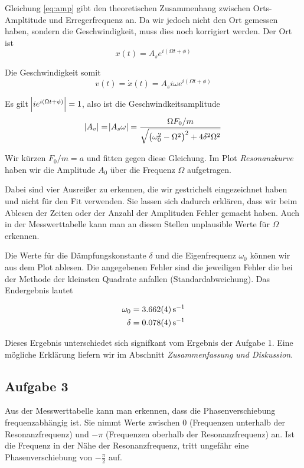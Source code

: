 \documentclass[a4paper,german,12pt,smallheadings]{scrartcl}
\begin{document}
\vspace{1cm}

Gleichung \ref{eq:amp} gibt den theoretischen Zusammenhang zwischen
Orts-Ampltitude und Erregerfrequenz an. Da wir jedoch nicht den Ort gemessen
haben, sondern die Geschwindigkeit, muss dies noch korrigiert werden. Der Ort
ist
\begin{equation}
  x(t) = A_s e^{i(\Omega t + \phi)}
\end{equation}

Die Geschwindigkeit somit
\begin{equation}
  v(t) = \dot{x}(t) = A_s i \omega e^{i(\Omega t + \phi)}
\end{equation}

Es gilt $\envert{i e^{i(\Omega t + \phi)}} = 1$, also ist die
Geschwindkeitsamplitude
\begin{equation}
  \envert{A_v} = \envert{A_s \omega} = \frac{\Omega F_0 / m}{\sqrt{\del{\omega_0^2 - \Omega^2}^2 + 4 \delta^2 \Omega^2}}
\end{equation}

Wir kürzen $F_0 / m = a$ und fitten gegen diese Gleichung. Im Plot
\textit{Resonanzkurve} haben wir die Amplitude $A_0$ über die Frequenz $\Omega$
aufgetragen.

Dabei sind vier Ausreißer zu erkennen, die wir gestrichelt eingezeichnet haben
und nicht für den Fit verwenden. Sie lassen sich dadurch erklären, dass wir
beim Ablesen der Zeiten oder der Anzahl der Amplituden Fehler gemacht haben.
Auch in der Messwerttabelle kann man an diesen Stellen unplausible Werte für
$\Omega$ erkennen.

Die Werte für die Dämpfungskonstante $\delta$ und die Eigenfrequenz $\omega_0$
können wir aus dem Plot ablesen.  Die angegebenen Fehler sind die jeweiligen
Fehler die bei der Methode der kleinsten Quadrate anfallen
(Standardabweichung). Das Endergebnis lautet

\begin{align}
  \omega_0 &= \SI{3.662+-0.004}{s^{-1}} \\
  \delta &= \SI{0.078+-0.004}{s^{-1}}
\end{align}

Dieses Ergebnis unterschiedet sich signifkant vom Ergebnis der Aufgabe 1. Eine
mögliche Erklärung liefern wir im Abschnitt \textit{Zusammenfassung und
Diskussion}.

\subsection{Aufgabe 3}
Aus der Messwerttabelle kann man erkennen, dass die Phasenverschiebung
frequenzabhängig ist. Sie nimmt Werte zwischen $0$ (Frequenzen unterhalb der
Resonanzfrequenz) und $-\pi$ (Frequenzen oberhalb der Resonanzfrequenz) an. Ist
die Frequenz in der Nähe der Resonanzfrequenz, tritt ungefähr eine
Phasenverschiebung von $-\frac{\pi}{2}$ auf.
\end{document}
